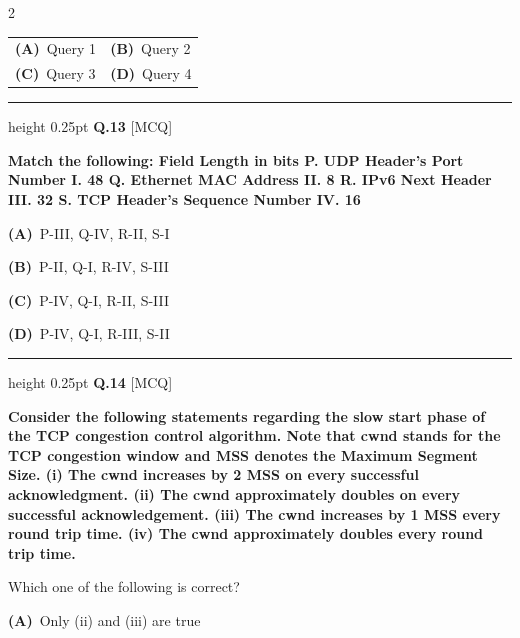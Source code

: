 \documentclass[a4paper,10pt,twoside]{article}
\begin{document}
\begin{multicols}{2}
\begin{tabular*}{\columnwidth}{@{\extracolsep{\fill}}p{}p{}@{}}
\textbf{(A)}~Query 1 & \textbf{(B)}~Query 2 \\
\addlinespace[2pt]
\textbf{(C)}~Query 3 & \textbf{(D)}~Query 4
\end{tabular*}
\par\vspace{6pt}\hrule height 0.25pt\vspace{6pt}
\noindent\textbf{Q.13} \hfill {\footnotesize\textsf{[MCQ]}}
\par\vspace{2pt}
{\bfseries Match the following:
Field
Length in bits
P. UDP Header's Port Number
I. 48
Q. Ethernet MAC Address
II. 8
R. IPv6 Next Header
III. 32
S. TCP Header's Sequence Number
IV. 16 \par}
\par\vspace{2pt}\noindent
\textbf{(A)}~P-III, Q-IV, R-II, S-I\par\vspace{2pt}\noindent
\textbf{(B)}~P-II, Q-I, R-IV, S-III\par\vspace{2pt}\noindent
\textbf{(C)}~P-IV, Q-I, R-II, S-III\par\vspace{2pt}\noindent
\textbf{(D)}~P-IV, Q-I, R-III, S-II
\par\vspace{6pt}\hrule height 0.25pt\vspace{6pt}
\noindent\textbf{Q.14} \hfill {\footnotesize\textsf{[MCQ]}}
\par\vspace{2pt}
{\bfseries Consider the following statements regarding the slow start phase of the TCP congestion
control algorithm. Note that cwnd stands for the TCP congestion window and MSS denotes
the Maximum Segment Size.
(i) The cwnd increases by 2 MSS on every successful acknowledgment.
(ii) The cwnd approximately doubles on every successful acknowledgement.
(iii) The cwnd increases by 1 MSS every round trip time.
(iv) The cwnd approximately doubles every round trip time.
\par\smallskip
Which one of the following is correct? \par}
\par\vspace{2pt}\noindent
\textbf{(A)}~Only (ii) and (iii) are true\par\vspace{2pt}\noindent

\end{multicols}
\end{document}
